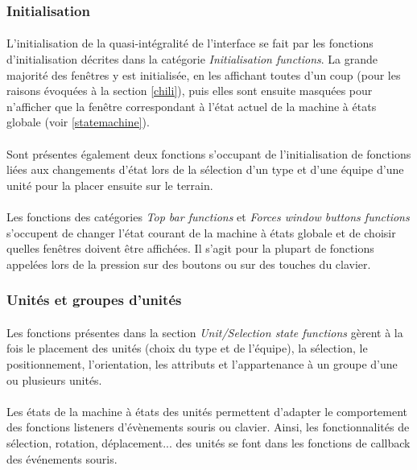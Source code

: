 \documentclass[a4paper]{article}
\begin{document}
\subsubsection{Initialisation}
\paragraph{}
L'initialisation de la quasi-intégralité de l'interface se fait par les fonctions d'initialisation décrites dans la catégorie \textit{Initialisation functions}. La grande majorité des fenêtres y est initialisée, en les affichant toutes d'un coup (pour les raisons évoquées à la section \ref{chili}), puis elles sont ensuite masquées pour n'afficher que la fenêtre correspondant à l'état actuel de la machine à états globale (voir \ref{statemachine}).
\paragraph{}
Sont présentes également deux fonctions s'occupant de l'initialisation de fonctions liées aux changements d'état lors de la sélection d'un type et d'une équipe d'une unité pour la placer ensuite sur le terrain.
\paragraph{}
Les fonctions des catégories \textit{Top bar functions} et \textit{Forces window buttons functions} s'occupent de changer l'état courant de la machine à états globale et de choisir quelles fenêtres doivent être affichées. Il s'agit pour la plupart de fonctions appelées lors de la pression sur des boutons ou sur des touches du clavier.
\subsubsection{Unités et groupes d'unités}
\paragraph{}
Les fonctions présentes dans la section \textit{Unit/Selection state functions} gèrent à la  fois le placement des unités (choix du type et de l'équipe), la sélection, le positionnement, l'orientation, les attributs et l'appartenance à un groupe d'une ou plusieurs unités.
\paragraph{} Les états de la machine à états des unités permettent d'adapter le comportement des fonctions listeners d'évènements souris ou clavier. Ainsi, les fonctionnalités de sélection, rotation, déplacement... des unités se font dans les fonctions de callback des événements souris.
\end{document}
